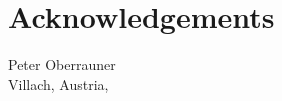 \chapter*{Acknowledgements}



\vspace{2cm}


\begin{flushright}
    Peter Oberrauner \\ {\small Villach, Austria, \thisdate}
\end{flushright}